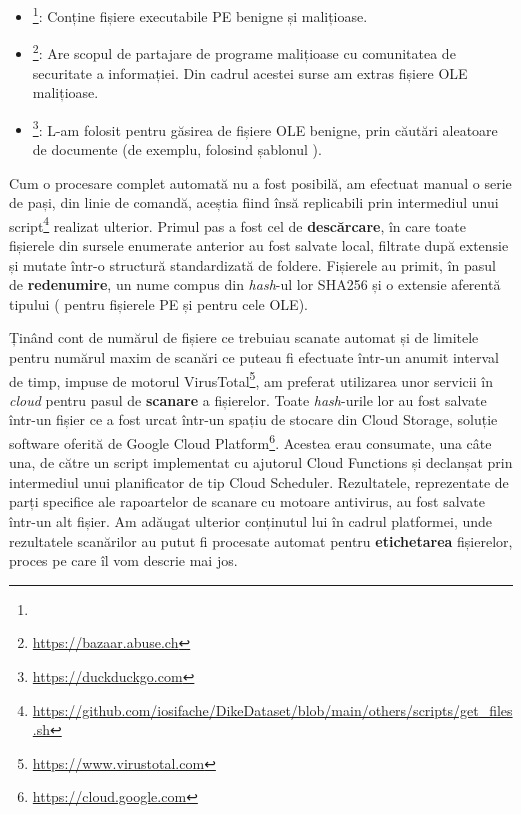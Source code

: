 \documentclass[../../main.tex]{subfiles}
\begin{document}
\begin{itemize}
    \item {}\footnote{}: Conține fișiere executabile PE benigne și malițioase.
    \item {}\footnote{\href{https://bazaar.abuse.ch}{https://bazaar.abuse.ch}}: Are scopul de partajare de programe mali\-țioase cu comunitatea de securitate a informației. Din cadrul acestei surse am extras fișiere OLE malițioase.
    \item {}\footnote{\href{https://duckduckgo.com}{https://duckduckgo.com}}: L-am folosit pentru găsirea de fișiere OLE benigne, prin căutări aleatoare de documente (de exemplu, folosind șablonul ).
\end{itemize}

Cum o procesare complet automată nu a fost posibilă, am efectuat manual o serie de pași, din linie de comandă, aceștia fiind însă replicabili prin intermediul unui script\footnote{\href{https://github.com/iosifache/DikeDataset/blob/main/others/scripts/get_files.sh}{https://github.com/iosifache/DikeDataset/blob/main/others/scripts/get\_files.sh}} realizat ulterior. Primul pas a fost cel de \textbf{descărcare}, în care toate fișierele din sursele enumerate anterior au fost salvate local, filtrate după extensie și mutate într-o structură standardizată de foldere. Fișierele au primit, în pasul de \textbf{redenumire}, un nume compus din \textit{hash}-ul lor SHA256 și o extensie aferentă tipului ( pentru fișierele PE și  pentru cele OLE).

Ținând cont de numărul de fișiere ce trebuiau scanate automat și de limitele pentru numărul maxim de scanări ce puteau fi efectuate într-un anumit interval de timp, impuse de motorul VirusTotal\footnote{\href{https://www.virustotal.com}{https://www.virustotal.com}}, am preferat utilizarea unor servicii în \textit{cloud} pentru pasul de \textbf{scanare} a fișierelor. Toate \textit{hash}-urile lor au fost salvate într-un fișier ce a fost urcat într-un spațiu de stocare din Cloud Storage, soluție software oferită de Google Cloud Platform\footnote{\href{https://cloud.google.com}{https://cloud.google.com}}. Acestea erau consumate, una câte una, de către un script implementat cu ajutorul Cloud Functions și declanșat prin intermediul unui planificator de tip Cloud Scheduler. Rezultatele, reprezentate de parți specifice ale rapoartelor de scanare cu motoare antivirus, au fost salvate într-un alt fișier. Am adăugat ulterior conținutul lui în cadrul platformei, unde rezultatele scanărilor au putut fi procesate automat pentru \textbf{etichetarea} fișierelor, proces pe care îl vom descrie mai jos.
\end{document}

